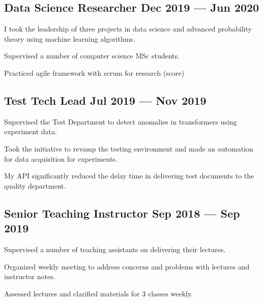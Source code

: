 \documentclass[letter,11pt]{article}
\begin{document}
\subsection{{Data Science Researcher \hfill Dec 2019 --- Jun 2020}}
\begin{zitemize}
	\item I took the leadership of three projects in data science and advanced probability theory using machine learning algorithms.
	\item Supervised a number of computer science MSc students.
	\item Practiced agile framework with scrum for research (score)
\end{zitemize}

\subsection{{Test Tech Lead \hfill Jul 2019 --- Nov 2019}}
\begin{zitemize}
	\item Supervised the Test Department to detect anomalies in transformers using experiment data.
	\item Took the initiative to revamp the testing environment and made an automation for data acquisition for experiments.
	\item My API significantly reduced the delay time in delivering test documents to the quality department.
\end{zitemize}

\subsection{Senior Teaching Instructor \hfill Sep 2018 --- Sep 2019}
\begin{zitemize}
	\item Supervised a number of teaching assistants on delivering their lectures.
	\item Organized weekly meeting to address concerns and problems with lectures and instructor notes.
	\item Assessed lectures and clarified materials for 3 classes weekly.
\end{zitemize}
\end{document}
